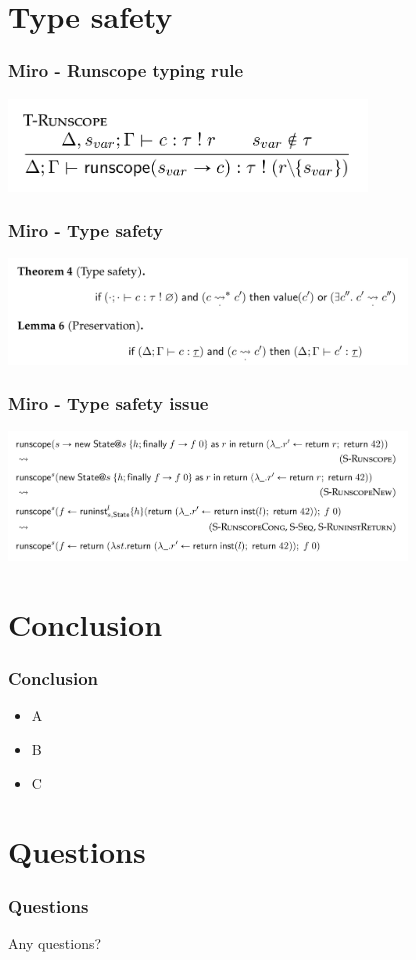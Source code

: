 \documentclass{beamer}
\begin{document}
\section{Type safety}

\begin{frame}[fragile]\frametitle{Miro - Runscope typing rule}
\begin{center}
\includegraphics[width=270pt]{images/typing-rule.png}
\end{center}
\end{frame}

\begin{frame}[fragile]\frametitle{Miro - Type safety}
\begin{center}
\includegraphics[width=300pt]{images/type-safety.png}
\end{center}
\end{frame}

\begin{frame}[fragile]\frametitle{Miro - Type safety issue}
\begin{center}
\includegraphics[width=300pt]{images/counter-example.png}
\end{center}
\end{frame}

\section{Conclusion}

\begin{frame}[fragile]\frametitle{Conclusion}
\begin{itemize}
\item A
\item B
\item C
\end{itemize}
\end{frame}

\section{Questions}

\begin{frame}[fragile]\frametitle{Questions}
Any questions?
\end{frame}
\end{document}
